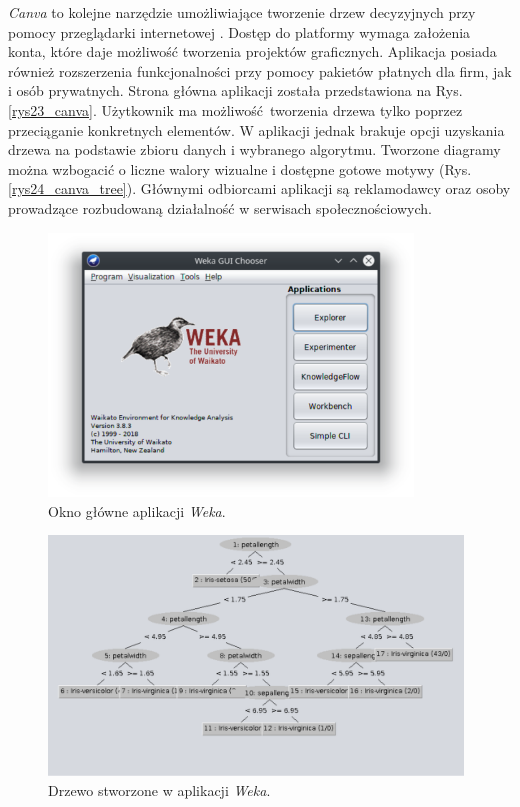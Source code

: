 \textit{Canva} to kolejne narzędzie umożliwiające tworzenie drzew decyzyjnych przy pomocy przeglądarki internetowej \cite{misc_canva}. Dostęp do platformy wymaga założenia konta, które daje możliwość tworzenia projektów graficznych. Aplikacja posiada również rozszerzenia funkcjonalności przy pomocy pakietów płatnych dla firm, jak i osób prywatnych. Strona główna aplikacji została przedstawiona na Rys. \ref{rys23_canva}. Użytkownik ma możliwość tworzenia drzewa tylko poprzez przeciąganie konkretnych elementów. W aplikacji jednak brakuje opcji uzyskania drzewa na podstawie zbioru danych i wybranego algorytmu. Tworzone diagramy można wzbogacić o liczne walory wizualne i dostępne gotowe motywy (Rys. \ref{rys24_canva_tree}). Głównymi odbiorcami aplikacji są reklamodawcy oraz osoby prowadzące rozbudowaną działalność w serwisach społecznościowych.  
 
\begin{figure}[htb]
	\centering
	\includegraphics[height=7cm]{grafika/weka.eps}
	\caption{Okno główne aplikacji \textit{Weka}.}
	\label{rys25_weka}
\end{figure}

\begin{figure}[htb]
	\centering
	\includegraphics[width=11cm]{grafika/weka_tree.eps}
	\caption{Drzewo stworzone w aplikacji \textit{Weka}.}
	\label{rys26_weka_tree}
\end{figure}

